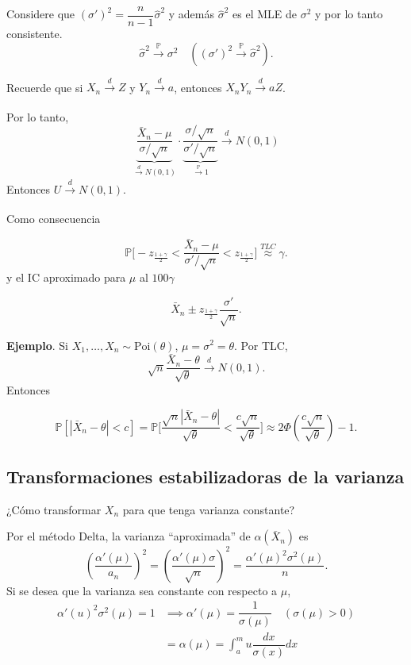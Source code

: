 \documentclass[
  12pt,
]{book}
\begin{document}
Considere que \((\sigma')^2 = \dfrac{n}{n-1}\hat \sigma^2\) y además \(\hat\sigma^2\) es el MLE de \(\sigma^2\) y por lo tanto consistente.
\[\hat\sigma^2 \xrightarrow[]{\mathbb P}\sigma^2 \quad ((\sigma')^2 \xrightarrow[]{\mathbb P}\hat\sigma^2).\]

Recuerde que si \(X_n\xrightarrow[]{d}Z\) y \(Y_n\xrightarrow[]{d}a\), entonces \(X_nY_n \xrightarrow[]{d}aZ\).

Por lo tanto,
\[\underbrace{\dfrac{\bar X_n-\mu}{\sigma/\sqrt n}}_{\xrightarrow[]{d} N(0,1)} \cdot \underbrace{\dfrac{\sigma/\sqrt n}{\sigma'/\sqrt n}}_{\xrightarrow[]{\mathbb P}1} \xrightarrow[]{d}N(0,1)\]
Entonces \(U\xrightarrow[]{d}N(0,1)\).

Como consecuencia

\[\mathbb P \bigg[-z_{\frac{1+\gamma}2}<\dfrac{\bar X_n-\mu}{\sigma'/\sqrt n} <z_{\frac{1+\gamma}2}\bigg] \stackrel{TLC}{\approx} \gamma.\]
y el IC aproximado para \(\mu\) al \(100\gamma\)

\[\bar X_n \pm z_{\frac{1+\gamma}2}\dfrac{\sigma'}{\sqrt n}.\]

\textbf{Ejemplo}. Si \(X_1,\dots, X_n\sim \text{Poi}(\theta)\), \(\mu =\sigma^2 = \theta\). Por TLC,
\[\sqrt n\dfrac{\bar X_n-\theta}{\sqrt{\theta}}\xrightarrow[]{d}N(0,1).\]
Entonces

\[\mathbb P[|\bar X_n-\theta|<c] = \mathbb P\bigg[\dfrac{\sqrt n|\bar X_n-\theta|}{\sqrt \theta}<\dfrac{c\sqrt n}{\sqrt \theta}\bigg] \approx 2\Phi\left(\dfrac{c\sqrt n}{\sqrt \theta}\right)-1.\]

\hypertarget{transformaciones-estabilizadoras-de-la-varianza}{%
\subsection{Transformaciones estabilizadoras de la varianza}\label{transformaciones-estabilizadoras-de-la-varianza}}

¿Cómo transformar \(X_n\) para que tenga varianza constante?

Por el método Delta, la varianza ``aproximada'' de \(\alpha(\bar X_n)\) es
\[\left( \dfrac{\alpha'(\mu)}{a_n}\right)^2 =\left( \dfrac{\alpha'(\mu)\sigma}{\sqrt n}\right)^2 = \dfrac{\alpha'(\mu)^2\sigma^2(\mu)}{n}.\]
Si se desea que la varianza sea constante con respecto a \(\mu\),
\begin{align*}
\alpha'(u)^2\sigma^2(\mu) = 1 &\implies \alpha'(\mu) = \dfrac{1}{\sigma(\mu)} \quad (\sigma(\mu)>0)\\
& = \alpha(\mu) = \int_{a}^mu \dfrac{dx}{\sigma(x)}dx
\end{align*}
\end{document}
